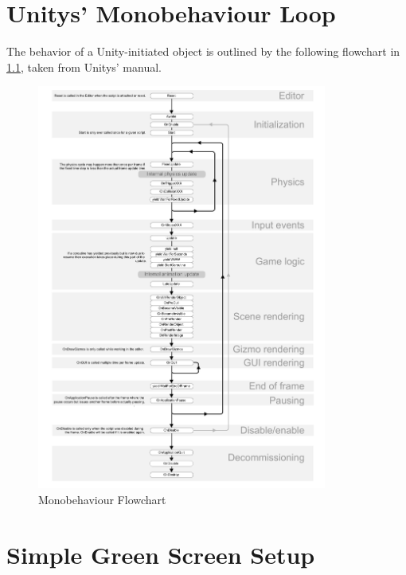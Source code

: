 %

\begingroup
\let\cleardoublepage\clearpage

\chapter{Unitys' Monobehaviour Loop}
\label{app:engineloop}

The behavior of a Unity-initiated object is outlined by the following 
flowchart in \ref{fig:appendix:monoflow}, taken from Unitys' manual.

\begin{figure}[htb]
	\centering
	\includegraphics[width=0.85\textwidth]{_external/media/monobehaviour_flowchart2.pdf}
	\caption{Monobehaviour Flowchart}
	\label{fig:appendix:monoflow}
\end{figure}


\chapter{Simple Green Screen Setup}

